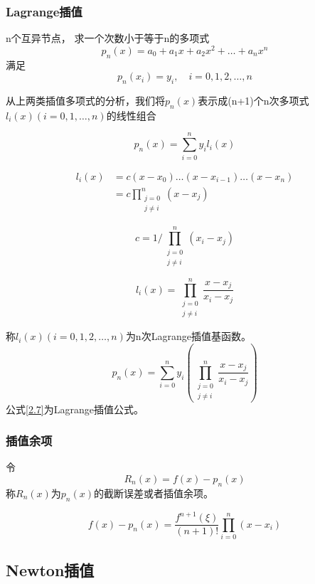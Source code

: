 \documentclass[12pt]{article}
\numberwithin{equation}{section}
\begin{document}
	\subsubsection{Lagrange插值}
	n个互异节点， 求一个次数小于等于n的多项式
	$$
	p_n (x) = a_0 + a_1 x + a_2 x^2 + \ldots + a_n x^n
	$$
	满足
	$$
	p_n (x_i) = y_i , \quad i=0, 1, 2, \ldots , n
	$$

	从上两类插值多项式的分析，我们将$p_n (x)$表示成(n+1)个n次多项式$l_i (x) (i=0,1,\ldots ,n)$的线性组合
	
	$$
	p_n (x) = \sum_{i=0}^n y_i l_i (x)
	$$

	$$
	\begin{aligned}
		l_i (x) & = c\left(x - x_0 \right)\ldots \left(x - x_{i-1} \right) \ldots \left(x - x_n \right)  \\
		& = c \prod_{\substack{j=0 \\ j \neq i}}^{n} (x - x_j)
	\end{aligned}
	$$

	$$
	c=1 / \prod_{\substack{j=0 \\ j \neq i}}^{n}\left(x_{i}-x_{j}\right)
	$$

	$$
	l_{i}(x)=\prod_{\substack{j=0 \\ j \neq i}}^{n} \frac{x-x_{j}}{x_{i}-x_{j}}
	$$

	称$l_i (x) (i=0, 1, 2, \ldots , n)$为n次Lagrange插值基函数。
	\begin{equation} \tag{2.7} \label{2.7}
		p_n (x) = \sum_{i=0}^n y_i(\prod_{\substack{j=0 \\ j \neq i}}^{n} \frac{x-x_{j}}{x_{i}-x_{j}})
	\end{equation}
	公式\eqref{2.7}为Lagrange插值公式。

	\subsubsection{插值余项}
	令
	$$
	R_n(x) = f(x) - p_n(x)
	$$
	称$R_n(x)$为$p_n(x)$的截断误差或者插值余项。

	\begin{equation} \tag{2.8} \label{2.8}
		f(x) - p_n(x) = \frac{f^{n+1}(\xi)}{(n+1)!} \prod_{i=0}^n(x - x_i)
	\end{equation}

	\subsection{Newton插值}
\end{document}
